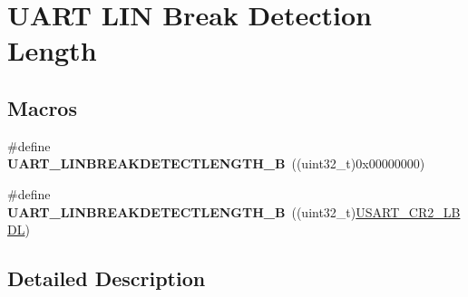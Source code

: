 \hypertarget{group___u_a_r_t___l_i_n___break___detection___length}{\section{U\-A\-R\-T L\-I\-N Break Detection Length}
\label{group___u_a_r_t___l_i_n___break___detection___length}
}
\subsection*{Macros}
\begin{DoxyCompactItemize}
\item 
\hypertarget{group___u_a_r_t___l_i_n___break___detection___length_ga027616b7a36b36e0e51ffee947533624}{\#define {\bfseries U\-A\-R\-T\-\_\-\-L\-I\-N\-B\-R\-E\-A\-K\-D\-E\-T\-E\-C\-T\-L\-E\-N\-G\-T\-H\-\_\-B}~((uint32\-\_\-t)0x00000000)}\label{group___u_a_r_t___l_i_n___break___detection___length_ga027616b7a36b36e0e51ffee947533624}

\item 
\hypertarget{group___u_a_r_t___l_i_n___break___detection___length_ga2f66fcd37de7a3ca9e1101305f2e23e6}{\#define {\bfseries U\-A\-R\-T\-\_\-\-L\-I\-N\-B\-R\-E\-A\-K\-D\-E\-T\-E\-C\-T\-L\-E\-N\-G\-T\-H\-\_\-B}~((uint32\-\_\-t)\hyperlink{group___peripheral___registers___bits___definition_ga7f9bc41700717fd93548e0e95b6072ed}{U\-S\-A\-R\-T\-\_\-\-C\-R2\-\_\-\-L\-B\-D\-L})}\label{group___u_a_r_t___l_i_n___break___detection___length_ga2f66fcd37de7a3ca9e1101305f2e23e6}

\end{DoxyCompactItemize}


\subsection{Detailed Description}
